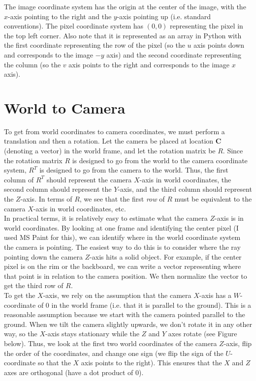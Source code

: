 \documentclass{article}
\begin{document}
The image coordinate system has the origin at the center of the image, with the $x$-axis pointing to the right and the $y$-axis pointing up (i.e. standard conventions). The pixel coordinate system has $(0, 0)$ representing the pixel in the top left corner. Also note that it is represented as an array in Python with the first coordinate representing the row of the pixel (so the $u$ axis points down and corresponds to the image $-y$ axis) and the second coordinate representing the column (so the $v$ axis points to the right and corresponds to the image $x$ axis).

\section{World to Camera}
To get from world coordinates to camera coordinates, we must perform a translation and then a rotation. Let the camera be placed at location $\bm{C}$ (denoting a vector) in the world frame, and let the rotation matrix be $R$. Since the rotation matrix $R$ is designed to go from the world to the camera coordinate system, $R^{T}$ is designed to go from the camera to the world. Thus, the first column of $R^{T}$ should represent the camera $X$-axis in world coordinates, the second column should represent the $Y$-axis, and the third column should represent the $Z$-axis. In terms of $R$, we see that the first \textit{row} of $R$ must be equivalent to the camera $X$-axis in world coordinates, etc. \\

In practical terms, it is relatively easy to estimate what the camera $Z$-axis is in world coordinates. By looking at one frame and identifying the center pixel (I used MS Paint for this), we can identify where in the world coordinate system the camera is pointing. The easiest way to do this is to consider where the ray pointing down the camera $Z$-axis hits a solid object. For example, if the center pixel is on the rim or the backboard, we can write a vector representing where that point is in relation to the camera position. We then normalize the vector to get the third row of $R$. \\

To get the $X$-axis, we rely on the assumption that the camera $X$-axis has a $W$-coordinate of 0 in the world frame (i.e. that it is parallel to the ground). This is a reasonable assumption because we start with the camera pointed parallel to the ground. When we tilt the camera slightly upwards, we don't rotate it in any other way, so the $X$-axis stays stationary while the $Z$ and $Y$ axes rotate (see Figure below). Thus, we look at the first two world coordinates of the camera $Z$-axis, flip the order of the coordinates, and change one sign (we flip the sign of the $U$-coordinate so that the $X$ axis points to the right). This ensures that the $X$ and $Z$ axes are orthogonal (have a dot product of 0). \\
\end{document}
